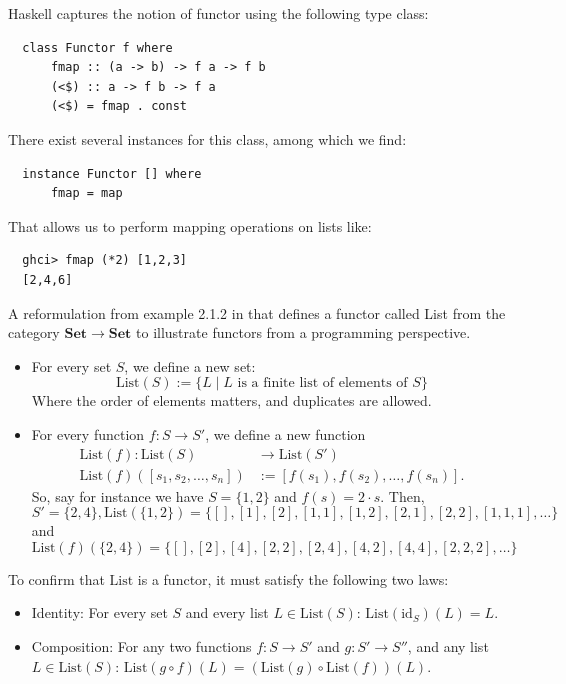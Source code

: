 \begin{example} Haskell captures the notion of functor using the following type class:
\begin{verbatim}
  class Functor f where
      fmap :: (a -> b) -> f a -> f b
      (<$) :: a -> f b -> f a
      (<$) = fmap . const
\end{verbatim}
There exist several instances for this class, among which we find:
\begin{verbatim}
  instance Functor [] where
      fmap = map
\end{verbatim}
That allows us to perform mapping operations on lists like:
\begin{verbatim}
  ghci> fmap (*2) [1,2,3]
  [2,4,6]
\end{verbatim}
\end{example}
\begin{example} A reformulation from example 2.1.2 in \cite{pierce1991basic} that defines a functor called List from the category $\mathbf{Set} \to \mathbf{Set}$ to illustrate functors from a programming perspective.
\begin{itemize}
\item For every set $S$, we define a new set:
\[
    \mathrm{List}(S) := \{ L \mid L \text{ is a finite list of elements of } S \}
\]
Where the order of elements matters, and duplicates are allowed.

\item For every function $f : S \to S'$, we define a new function
\begin{align*}
  \mathrm{List}(f) : \mathrm{List}(S) &\to \mathrm{List}(S') \\
  \mathrm{List}(f)([s_1, s_2, \dots, s_n]) &:= [f(s_1), f(s_2), \dots, f(s_n)].
\end{align*}
So, say for instance we have $S = \{ 1, 2 \}$ and $f(s) = 2 \cdot s $. Then,
\[
  S' = \{2, 4\}, \mathrm{List}(\{1, 2\}) = \{ [], [1], [2], [1,1], [1,2], [2,1], [2,2], [1,1,1], \dots \}
\]
and
\[
  \mathrm{List}(f)(\{2, 4\}) = \{ [], [2], [4], [2,2], [2,4], [4,2], [4,4], [2,2,2], \dots \}
\]

\end{itemize}
To confirm that \(\mathrm{List}\) is a functor, it must satisfy the following two laws:
\begin{itemize}
\item Identity: For every set $S$ and every list $L \in \mathrm{List}(S)$: \(
\mathrm{List}(\mathrm{id}_S)(L) = L. \)
\item Composition: For any two functions $f : S \to S'$ and $g : S' \to S''$, and any list $L \in \mathrm{List}(S)$:
\(
\mathrm{List}(g \circ f)(L) = (\mathrm{List}(g) \circ \mathrm{List}(f))(L).
\)
\end{itemize}
\end{example}

